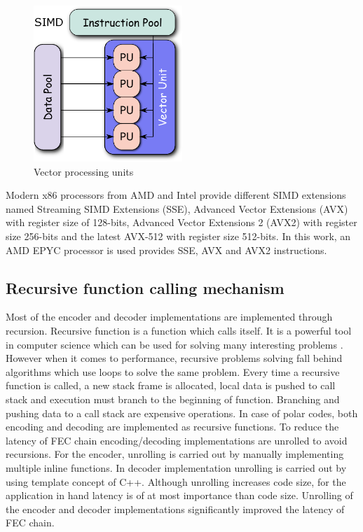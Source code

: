 \begin{figure}[h]
	\centering
	\includegraphics[width=0.5\textwidth]{./figures/SIMD2.eps}
	\caption{Vector processing units \cite{SIMDWiki}}
	\label{fig:simdUnits}
\end{figure}

Modern x86 processors from AMD and Intel provide different SIMD extensions named Streaming SIMD Extensions (SSE), Advanced Vector Extensions (AVX) with register size of 128-bits, Advanced Vector Extensions 2 (AVX2) with register size 256-bits and the latest AVX-512 with register size 512-bits. In this work, an AMD EPYC processor is used provides SSE, AVX and AVX2 instructions.


\subsection{Recursive function calling mechanism}
Most of the encoder and decoder implementations are implemented through recursion. Recursive function is a function which calls itself. It is a powerful tool in computer science which can be used for solving many interesting problems \cite{CLRS}. However when it comes to performance, recursive problems solving fall behind algorithms which use loops to solve the same problem. Every time a recursive function is called, a new stack frame is allocated, local data is pushed to call stack and execution must branch to the beginning of function. Branching and pushing data to a call stack are expensive operations. In case of polar codes, both encoding and decoding are implemented as recursive functions. To reduce the latency of FEC chain encoding/decoding implementations are unrolled to avoid recursions. For the encoder, unrolling is carried out by manually implementing multiple inline functions. In decoder implementation unrolling is carried out by using template concept of C++. Although unrolling increases code size, for the application in hand latency is of at most importance than code size. Unrolling of the encoder and decoder implementations significantly improved the latency of FEC chain. 